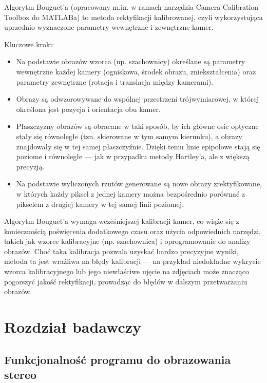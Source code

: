 \documentclass[magisterska]{pracadypl}
\begin{document}
Algorytm Bouguet’a \cite{bouget} (opracowany m.in. w ramach narzędzia Camera Calibration Toolbox do MATLABa) to metoda rektyfikacji kalibrowanej, czyli wykorzystująca uprzednio wyznaczone parametry wewnętrzne i zewnętrzne kamer.

\bigskip

Kluczowe kroki:

\begin{itemize}
  \item Na podstawie obrazów wzorca (np. szachownicy) określane są parametry wewnętrzne każdej kamery (ogniskowa, środek obrazu, zniekształcenia) oraz parametry zewnętrzne (rotacja i translacja między kamerami).

  \item Obrazy są odwzorowywane do wspólnej przestrzeni trójwymiarowej, w której określona jest pozycja i orientacja obu kamer.


  \item Płaszczyzny obrazów są obracane w taki sposób, by ich główne osie optyczne stały się równoległe (tzn. skierowane w tym samym kierunku), a obrazy znajdowały się w tej samej płaszczyźnie. Dzięki temu linie epipolowe stają się poziome i równoległe — jak w przypadku metody Hartley’a, ale z większą precyzją.


  \item Na podstawie wyliczonych rzutów generowane są nowe obrazy zrektyfikowane, w których każdy piksel z jednej kamery można bezpośrednio porównać z pikselem z drugiej kamery w tej samej linii poziomej.
\end{itemize}

Algorytm Bouguet’a wymaga wcześniejszej kalibracji kamer, co wiąże się z koniecznością poświęcenia dodatkowego czasu oraz użycia odpowiednich narzędzi, takich jak wzorce kalibracyjne (np. szachownica) i oprogramowanie do analizy obrazów. Choć taka kalibracja pozwala uzyskać bardzo precyzyjne wyniki, metoda ta jest wrażliwa na błędy kalibracji — na przykład niedokładne wykrycie wzorca kalibracyjnego lub jego niewłaściwe ujęcie na zdjęciach może znacząco pogorszyć jakość rektyfikacji, prowadząc do błędów w dalszym przetwarzaniu obrazów.

\chapter{Rozdział badawczy}

\section{Funkcjonalność programu do obrazowania stereo}
\end{document}
